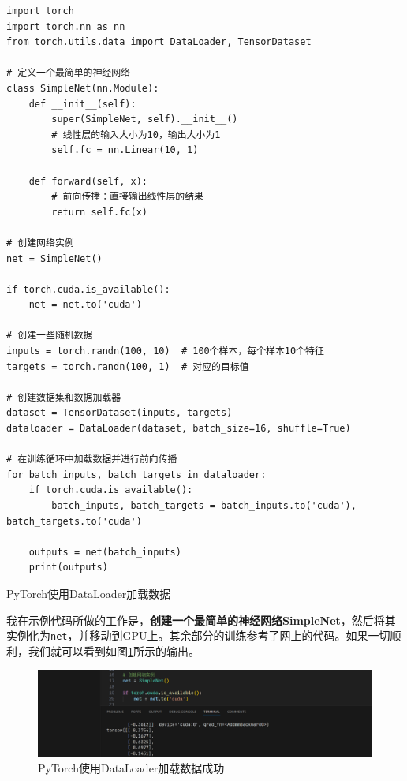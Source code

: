 \begin{longlisting}
    \begin{verbatim}
import torch
import torch.nn as nn
from torch.utils.data import DataLoader, TensorDataset

# 定义一个最简单的神经网络
class SimpleNet(nn.Module):
    def __init__(self):
        super(SimpleNet, self).__init__()
        # 线性层的输入大小为10，输出大小为1
        self.fc = nn.Linear(10, 1)

    def forward(self, x):
        # 前向传播：直接输出线性层的结果
        return self.fc(x)

# 创建网络实例
net = SimpleNet()

if torch.cuda.is_available():
    net = net.to('cuda')

# 创建一些随机数据
inputs = torch.randn(100, 10)  # 100个样本，每个样本10个特征
targets = torch.randn(100, 1)  # 对应的目标值

# 创建数据集和数据加载器
dataset = TensorDataset(inputs, targets)
dataloader = DataLoader(dataset, batch_size=16, shuffle=True)

# 在训练循环中加载数据并进行前向传播
for batch_inputs, batch_targets in dataloader:
    if torch.cuda.is_available():
        batch_inputs, batch_targets = batch_inputs.to('cuda'), batch_targets.to('cuda')
    
    outputs = net(batch_inputs)
    print(outputs)
    \end{verbatim}
    \caption{PyTorch使用DataLoader加载数据}
    \label{listing:pytorch-dataloader}
\end{longlisting}

我在示例代码所做的工作是，\textbf{创建一个最简单的神经网络SimpleNet}，然后将其实例化为\texttt{net}，并移动到GPU上。其余部分的训练参考了网上的代码。如果一切顺利，我们就可以看到如图\ref{fig:pytorch-dataloader}所示的输出。

\begin{figure}[htbp]
    \centering
    \includegraphics[width=\textwidth]{Figures/dataloader.png}
    \caption{PyTorch使用DataLoader加载数据成功}
    \label{fig:pytorch-dataloader}
\end{figure}